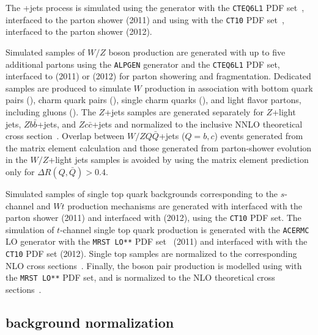 The \ttbar{}+jets process is simulated using the \alpgen{} generator
with the {\tt CTEQ6L1} PDF set~\cite{cteq6}, interfaced to the 
\herwig{} parton shower (2011) and using \powheg{} with the {\tt CT10}
PDF set~\cite{ct10}, interfaced to the \pythia{} parton shower
(2012).

Simulated samples of $W/Z$ boson production are generated with up to
five additional partons using the {\tt ALPGEN} generator and the
{\tt CTEQ6L1} PDF set, interfaced to \herwig{} (2011) or
\pythia{} (2012) for parton showering and fragmentation. 
Dedicated samples are produced to simulate $W$ production in
association with bottom quark pairs (\wbb{}), charm quark
pairs (\wcc{}), single charm quarks (\wc{}), and light
flavor partons, including gluons (\wlight{}).
The $Z$+jets samples are generated separately for $Z$+light jets,
$Zb\bar{b}$+jets, and $Zc\bar{c}$+jets and normalized to the inclusive
NNLO theoretical cross section~\cite{vjetsxs}.
Overlap between $W/ZQ\bar{Q}$+jets ($Q=b,c$) events generated from the
matrix element calculation and those generated from parton-shower
evolution in the $W/Z$+light jets samples is avoided by using the
matrix element prediction only for $\Delta R(Q,\bar{Q})>0.4$.

Simulated samples of single top quark backgrounds corresponding to the
$s$-channel and $Wt$ production mechanisms are generated with \mcatnlo{}
interfaced with the \herwig{} parton shower (2011) and \powheg{}
interfaced with \pythia{} (2012), using the {\tt CT10} PDF set.
The simulation of $t$-channel single top quark production is
generated with the {\tt ACERMC} LO generator with the {\tt MRST LO**}
PDF set~\cite{mrst}  (2011) and \powheg{} interfaced with \pythia{}
with the {\tt CT10} PDF set (2012). Single top samples are normalized
to the corresponding NLO cross sections~\cite{stschan,sttchan,stwt}.
Finally, the boson pair production is modelled using \herwig{} with
the {\tt MRST LO**} PDF set, and is normalized to the NLO
theoretical cross sections~\cite{dibosonxs}.

\subsection{\wjets{} background normalization}
\label{sec:wjets}

